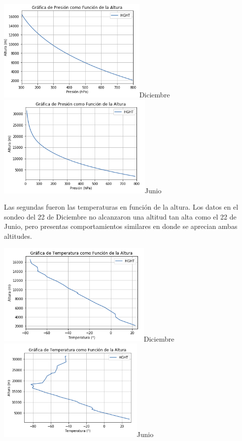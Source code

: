 \documentclass{article}
\begin{document}
    \begin{center}
    \includegraphics[height=5cm]{PresionDec.png}{Diciembre}
    \includegraphics[height=5cm]{PresionJun.png}{Junio}
    \end{center}
    
    Las segundas fueron las temperaturas en función de la altura. Los datos en el sondeo del 22 de Diciembre no alcanzaron una altitud tan alta como el 22 de Junio, pero presentas comportamientos similares en donde se aprecian ambas altitudes.
    
    \begin{center}
    \includegraphics[height=5cm]{TempDec.png}{Diciembre}
    \includegraphics[height=5cm]{TempJun.png}{Junio}
    \end{center}
    
\end{document}
